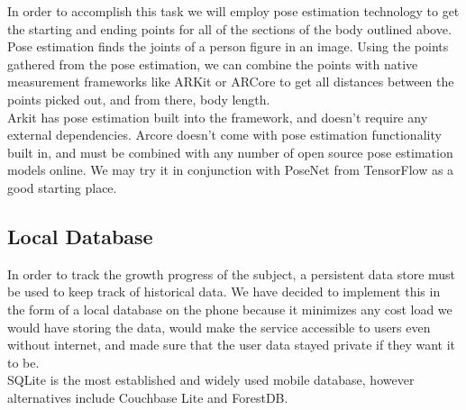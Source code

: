 \documentclass[letterpaper,10pt,draftclsnofoot,onecolumn,compsoc]{IEEEtran}
\begin{document}
In order to accomplish this task we will employ pose estimation technology to get the starting and ending points for all of the sections of the body outlined above. Pose estimation finds the joints of a person figure in an image. Using the points gathered from the pose estimation, we can combine the points with native measurement frameworks like ARKit or ARCore to get all distances between the points picked out, and from there, body length.\\

Arkit has pose estimation built into the framework, and doesn't require any external dependencies. Arcore doesn't come with pose estimation functionality built in, and must be combined with any number of open source pose estimation models online. We may try it in conjunction with PoseNet from TensorFlow as a good starting place.

\subsection{Local Database}
In order to track the growth progress of the subject, a persistent data store must be used to keep track of historical data. We have decided to implement this in the form of a local database on the phone because it minimizes any cost load we would have storing the data, would make the service accessible to users even without internet, and made sure that the user data stayed private if they want it to be.\\

SQLite is the most established and widely used mobile database, however alternatives include Couchbase Lite and ForestDB. 

\end{document}
